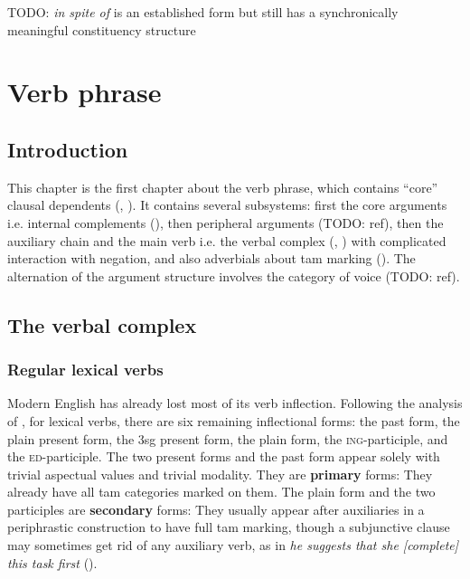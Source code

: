 \documentclass[UTF8, a4paper, oneside, scheme=plain, 12pt]{ctexbook}
\newcommand*{\citesec}[1]{\S~{#1}}
\newcommand*{\citechap}[1]{Ch.~{#1}}
\newcommand*{\citechapsec}[2]{\citechap{#1}.\citesec{#2}}
\newcommand*{\concept}[1]{\textbf{#1}}
\newcommand{\form}[1]{\emph{#1}}
\newcommand{\formcat}[1]{\textsc{#1}}
\begin{document}
TODO: \form{in spite of} is an established form but still has a synchronically meaningful constituency structure


\chapter{Verb phrase}\label{chap:verb-phrase}

\section{Introduction}

This chapter is the first chapter about the verb phrase,
which contains ``core'' clausal dependents 
(, ).
It contains several subsystems: 
first the core arguments i.e. internal complements (),
then peripheral arguments (TODO: ref), 
then the auxiliary chain and the main verb i.e. the verbal complex
(, ) 
with complicated interaction with negation, 
and also adverbials about \acs{tam} marking 
(). 
The alternation of the argument structure involves the category of voice (TODO: ref).

\section{The verbal complex}\label{sec:verbal-complex}


\subsection{Regular lexical verbs}\label{sec:verb-forms}

Modern English has already lost most of its verb inflection.
Following the analysis of \citet[\citechapsec{3}{1.1}]{cgel},
for lexical verbs,
there are six remaining inflectional forms: 
the past form, the plain present form, 
the 3sg present form,
the plain form, the \formcat{ing}-participle,
and the \formcat{ed}-participle.
The two present forms and the past form appear solely 
with trivial aspectual values and trivial modality.
They are \concept{primary} forms:
They already have all \acs{tam} categories marked on them.
The plain form and the two participles are \concept{secondary} forms:
They usually appear after auxiliaries 
in a periphrastic construction to have full \acs{tam} marking,
though a subjunctive clause may sometimes get rid of any auxiliary verb,
as in \form{he suggests that she [complete] this task first} ().
\end{document}
